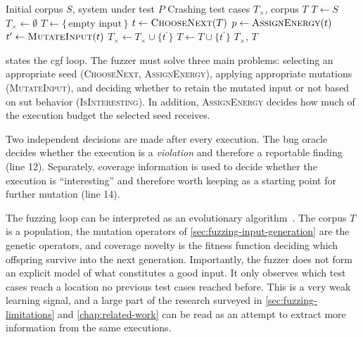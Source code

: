 \begin{algorithm}[H]
  \caption{Coverage-guided greybox fuzzing, following \textcite{bohme_coverage-based_2016}.}
  \label{alg:cgf}
  \begin{algorithmic}[1]
    \Require Initial corpus $S$, system under test $P$
    \Ensure Crashing test cases $T_\times$, corpus $T$
    \State $T \gets S$
    \State $T_\times \gets \emptyset$
      \State $T \gets \{\,\text{empty input}\,\}$
    \EndIf
    \Repeat
      \State $t \gets \Call{ChooseNext}{T}$
      \State $p \gets \Call{AssignEnergy}{t}$
        \State $t^\prime \gets \Call{MutateInput}{t}$
          \State $T_\times \gets T_\times \cup \{t^\prime\}$
          \State $T \gets T \cup \{t^\prime\}$
        \EndIf
      \EndFor
    \State \Return $T_\times$, $T$
  \end{algorithmic}
\end{algorithm}

 states the \gls{cgf} loop.
The fuzzer must solve three main problems: selecting an appropriate
seed (\textsc{ChooseNext}, \textsc{AssignEnergy}), applying appropriate mutations (\textsc{MutateInput}), and deciding whether to retain the
mutated input or not based on \gls{sut} behavior (\textsc{IsInteresting}).
In addition, \textsc{AssignEnergy} decides how much of the execution budget the selected seed receives.

Two independent decisions are made after every execution.
The bug oracle decides whether the execution is a
\emph{violation} and therefore a reportable finding (line 12).
Separately, coverage information
is used to decide whether the execution is \enquote{interesting} and therefore worth keeping as a starting point for
further mutation (line 14).

The fuzzing loop can be interpreted as an evolutionary algorithm~\cite{she_neuzz_2019,manes_art_2019}.
The corpus $T$ is a population, the mutation operators of
\cref{sec:fuzzing-input-generation} are the genetic operators, and coverage novelty is the
fitness function deciding which offspring survive into the next generation.
Importantly, the fuzzer does not form an explicit model of what constitutes a good input.
It only observes which test cases reach a location no previous test cases reached before.
This is a very weak learning signal, and a large part of the research surveyed in
\cref{sec:fuzzing-limitations} and \cref{chap:related-work} can be read as an attempt to
extract more information from the same executions.


